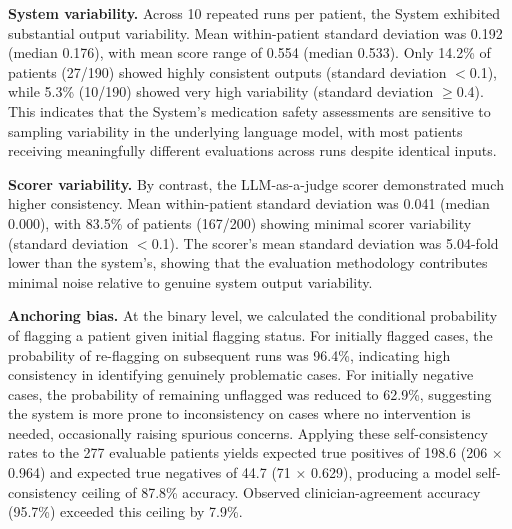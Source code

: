 \label{sec:self-consistency-anchoring-bias}

\textbf{System variability.} Across 10 repeated runs per patient, the System exhibited substantial output variability. Mean within-patient standard deviation was 0.192 (median 0.176), with mean score range of 0.554 (median 0.533). Only 14.2\% of patients (27/190) showed highly consistent outputs (standard deviation $<$0.1), while 5.3\% (10/190) showed very high variability (standard deviation $\geq$0.4). This indicates that the System's medication safety assessments are sensitive to sampling variability in the underlying language model, with most patients receiving meaningfully different evaluations across runs despite identical inputs.

\textbf{Scorer variability.} By contrast, the LLM-as-a-judge scorer demonstrated much higher consistency. Mean within-patient standard deviation was 0.041 (median 0.000), with 83.5\% of patients (167/200) showing minimal scorer variability (standard deviation $<$0.1). The scorer's mean standard deviation was 5.04-fold lower than the system's, showing that the evaluation methodology contributes minimal noise relative to genuine system output variability.

\textbf{Anchoring bias.} At the binary level, we calculated the conditional probability of flagging a patient given initial flagging status. For initially flagged cases, the probability of re-flagging on subsequent runs was 96.4\%, indicating high consistency in identifying genuinely problematic cases. For initially negative cases, the probability of remaining unflagged was reduced to 62.9\%, suggesting the system is more prone to inconsistency on cases where no intervention is needed, occasionally raising spurious concerns. Applying these self-consistency rates to the 277 evaluable patients yields expected true positives of 198.6 (206 × 0.964) and expected true negatives of 44.7 (71 × 0.629), producing a model self-consistency ceiling of 87.8\% accuracy. Observed clinician-agreement accuracy (95.7\%) exceeded this ceiling by 7.9\%.